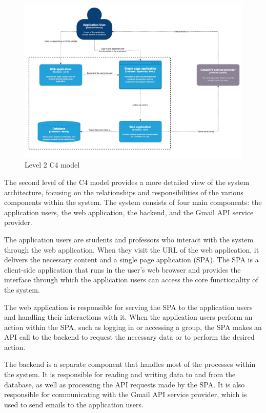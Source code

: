 \documentclass[singlespacing,12pt,parskip,headsepline,consistentlayout]{article}
\begin{document}
\begin{figure}[H]
    \centering
    \includegraphics[width=\textwidth,height=\textheight,keepaspectratio]{img/c4_level2.png}
    \caption{Level 2 C4 model}
\end{figure}

The second level of the C4 model provides a more detailed view of the system architecture, focusing on the relationships and responsibilities of the various components within the system. The system consists of four main components: the application users, the web application, the backend, and the Gmail API service provider.

The application users are students and professors who interact with the system through the web application. When they visit the URL of the web application, it delivers the necessary content and a single page application (SPA). The SPA is a client-side application that runs in the user's web browser and provides the interface through which the application users can access the core functionality of the system.

The web application is responsible for serving the SPA to the application users and handling their interactions with it. When the application users perform an action within the SPA, such as logging in or accessing a group, the SPA makes an API call to the backend to request the necessary data or to perform the desired action.

The backend is a separate component that handles most of the processes within the system. It is responsible for reading and writing data to and from the database, as well as processing the API requests made by the SPA. It is also responsible for communicating with the Gmail API service provider, which is used to send emails to the application users.
\end{document}
